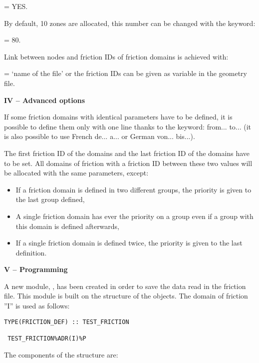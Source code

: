  = YES.

By default, 10 zones are allocated, this number can be changed with the keyword:

 = 80.

Link between nodes and friction IDs of friction domains is achieved with:

 = `name of the file'
or \newline
the friction IDs can be given as variable
 in the geometry file.

\textbf{IV -- Advanced options}

If some friction domains with identical parameters have to be defined,
it is possible to define them only with one line thanks to the keyword:
from... to... (it is also possible to use French de... a...
or German von... bis...).

The first friction ID of the domains and the last friction ID of the domains
have to be set.
All domains of friction with a friction ID between these two values will be
allocated with the same parameters, except:
\begin{itemize}
\item If a friction domain is defined in two different groups,
the priority is given to the last group defined,

\item A single friction domain has ever the priority on a group even
if a group with this domain is defined afterwards,

\item If a single friction domain is defined twice, the priority is given to the
last definition.
\end{itemize}

\textbf{V -- Programming}

A new module, , has been created in order to save the
data read in the friction file.
This module is built on the structure of the  objects.
The domain of friction ''I'' is used as follows:
\begin{lstlisting}[language=TelFortran]
 TYPE(FRICTION_DEF) :: TEST_FRICTION

 TEST_FRICTION%ADR(I)%P
\end{lstlisting}
 The components of the structure are:



